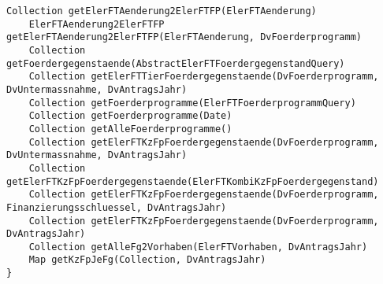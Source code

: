 \begin{lstlisting}[style = dsl, caption = Deklaration von ElerFTStammdatenAuskunftService, captionpos = b, label = lst_eftstd]
	Collection getElerFTAenderung2ElerFTFP(ElerFTAenderung)
	ElerFTAenderung2ElerFTFP getElerFTAenderung2ElerFTFP(ElerFTAenderung, DvFoerderprogramm)
	Collection getFoerdergegenstaende(AbstractElerFTFoerdergegenstandQuery)
	Collection getElerFTTierFoerdergegenstaende(DvFoerderprogramm, DvUntermassnahme, DvAntragsJahr)
	Collection getFoerderprogramme(ElerFTFoerderprogrammQuery)
	Collection getFoerderprogramme(Date)
	Collection getAlleFoerderprogramme()
	Collection getElerFTKzFpFoerdergegenstaende(DvFoerderprogramm, DvUntermassnahme, DvAntragsJahr)
	Collection getElerFTKzFpFoerdergegenstaende(ElerFTKombiKzFpFoerdergegenstand)
	Collection getElerFTKzFpFoerdergegenstaende(DvFoerderprogramm, Finanzierungsschluessel, DvAntragsJahr)
	Collection getElerFTKzFpFoerdergegenstaende(DvFoerderprogramm, DvAntragsJahr)
	Collection getAlleFg2Vorhaben(ElerFTVorhaben, DvAntragsJahr)
	Map getKzFpJeFg(Collection, DvAntragsJahr)
}
\end{lstlisting}
